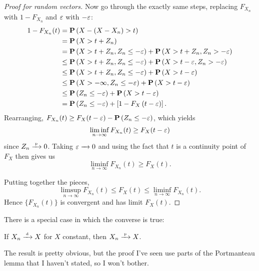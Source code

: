 \documentclass[11pt,letterpaper,reqno,oneside]{article}
\begin{document}
\begin{proof}[Proof for random vectors]
	Now go through the exactly same steps, replacing $F_{X_n}$ with $1-F_{X_n}$ and $\varepsilon$ with $-\varepsilon$:
	\begin{align*}
		1 - F_{X_n}(t)
		={}& \mathbf{P}\left( X - ( X - X_n) > t \right) \\
		={}& \mathbf{P}\left( X > t + Z_n \right) \\
		={}& \mathbf{P}\left( X > t + Z_n, Z_n \leq -\varepsilon \right)
		+ \mathbf{P}\left( X > t + Z_n, Z_n > -\varepsilon \right) \\
		\leq{}& \mathbf{P}\left( X > t + Z_n, Z_n \leq -\varepsilon \right)
		+ \mathbf{P}\left( X > t -\varepsilon, Z_n > -\varepsilon \right) \\
		\leq{}& \mathbf{P}\left( X > t + Z_n, Z_n \leq -\varepsilon \right)
		+ \mathbf{P}\left( X > t -\varepsilon \right) \\
		\leq{}& \mathbf{P}\left( X > -\infty, Z_n \leq -\varepsilon \right)
		+ \mathbf{P}\left( X > t -\varepsilon \right) \\
		\leq{}& \mathbf{P}\left( Z_n \leq -\varepsilon \right)
		+ \mathbf{P}\left( X > t -\varepsilon \right) \\
		={}& \mathbf{P}\left( Z_n \leq -\varepsilon \right)
		+ \left[ 1 - F_X\left( t -\varepsilon \right) \right] .
	\end{align*}
	Rearranging, $F_{X_n}(t) \geq F_X(t-\varepsilon) - \mathbf{P}\left( Z_n \leq -\varepsilon \right)$, which yields
	\begin{equation*}
		\liminf_{n\to\infty} F_{X_n}(t) \geq F_X(t-\varepsilon) 
	\end{equation*}
	since $Z_n \xrightarrow{{\scriptscriptstyle \mathrm{\;p\;}}} 0$. Taking $\varepsilon\xrightarrow{\;\;\;} 0$ and using the fact that $t$ is a continuity point of $F_X$ then gives us
	\begin{equation*}
		\liminf_{n\to\infty} F_{X_n}(t) \geq F_X(t) .
	\end{equation*}

	Putting together the pieces,
	\begin{equation*}
		\limsup_{n\to\infty} F_{X_n}(t) 
		\leq F_X(t)
		\leq \liminf_{n\to\infty} F_{X_n}(t) .
	\end{equation*}
	Hence $\{ F_{X_n}(t) \}$ is convergent and has limit $F_X(t)$.
\end{proof}


There is a special case in which the converse is true:
%
\begin{proposition}
	\label{proposition:convd_convp}
	If $X_n \xrightarrow{{\scriptscriptstyle \mathrm{\;d\;}}} X$ for $X$ constant, then $X_n \xrightarrow{{\scriptscriptstyle \mathrm{\;p\;}}} X$.
\end{proposition}

The result is pretty obvious, but the proof I've seen use parts of the Portmanteau lemma that I haven't stated, so I won't bother.
\end{document}
